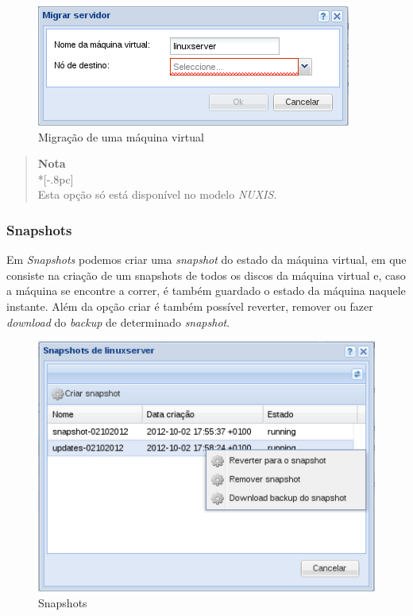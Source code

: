 \begin{figure}[H]
	\begin{center}
	\includegraphics[scale=0.5]{screenshots/server_migrate.png}
	\caption{Migração de uma máquina virtual}
	\label{fig:server_migrate}
	\end{center}
\end{figure}

\begin{quote}
	{\large \bf Nota} \\*[-.8pc]
	\underline{\hspace{6in}} \\
	Esta opção só está disponível no modelo \emph{NUXIS}.
\end{quote}

\subsubsection{Snapshots}
\label{sec:server_snapshots}

Em \emph{Snapshots} podemos criar uma \emph{snapshot} do estado da máquina virtual, em que consiste na criação de um snapshots de todos os discos da máquina virtual e, caso a máquina se encontre a correr, é também guardado o estado da máquina naquele instante.
Além da opção criar é também possível reverter, remover ou fazer \emph{download} do \emph{backup} de determinado \emph{snapshot}.

\begin{figure}[H]
	\begin{center}
	\includegraphics[scale=0.5]{screenshots/server_snapshots.png}
	\caption{Snapshots}
	\label{fig:server_snapshots}
	\end{center}
\end{figure}

